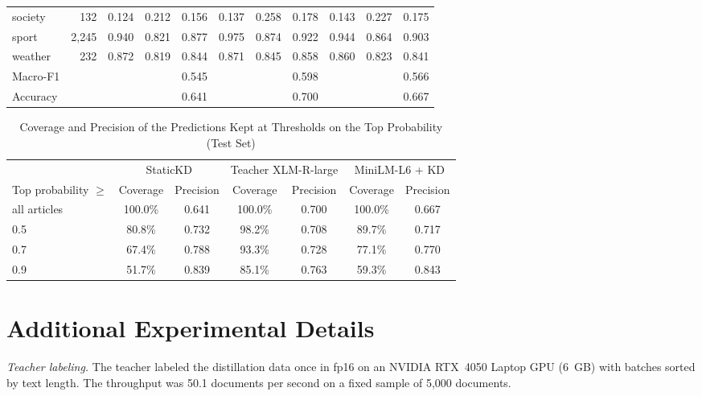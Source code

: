 \documentclass[journal,onecolumn]{IEEEtran}
\begin{document}
\begin{table}[!htbp]
{\begin{tabular}{@{}lrccccccccc@{}}
society & 132 & 0.124 & 0.212 & 0.156 & 0.137 & 0.258 & 0.178 & 0.143 & 0.227 & 0.175 \\
sport & 2,245 & 0.940 & 0.821 & 0.877 & 0.975 & 0.874 & 0.922 & 0.944 & 0.864 & 0.903 \\
weather & 232 & 0.872 & 0.819 & 0.844 & 0.871 & 0.845 & 0.858 & 0.860 & 0.823 & 0.841 \\
\midrule
Macro-F1 &  &  &  & 0.545 &  &  & 0.598 &  &  & 0.566 \\
Accuracy &  &  &  & 0.641 &  &  & 0.700 &  &  & 0.667 \\
\bottomrule
\end{tabular}}
\par\vspace{2pt}{\footnotesize $n$ = number of test articles with the label. Precision is computed over all test articles predicted with the label.\par}
\end{table}

\begin{table}[!htbp]
\caption{Coverage and Precision of the Predictions Kept at Thresholds on the Top Probability (Test Set)}
\label{tab:thresholds}
\centering
\footnotesize
\setlength{\tabcolsep}{4pt}
\begin{tabular}{@{}lcccccc@{}}
\toprule
 & \multicolumn{2}{c}{StaticKD} & \multicolumn{2}{c}{Teacher XLM-R-large} & \multicolumn{2}{c}{MiniLM-L6 + KD} \\
\cmidrule(lr){2-3}\cmidrule(lr){4-5}\cmidrule(lr){6-7}
Top probability $\ge$ & Coverage & Precision & Coverage & Precision & Coverage & Precision \\
\midrule
all articles & 100.0\% & 0.641 & 100.0\% & 0.700 & 100.0\% & 0.667 \\
0.5 & 80.8\% & 0.732 & 98.2\% & 0.708 & 89.7\% & 0.717 \\
0.7 & 67.4\% & 0.788 & 93.3\% & 0.728 & 77.1\% & 0.770 \\
0.9 & 51.7\% & 0.839 & 85.1\% & 0.763 & 59.3\% & 0.843 \\
\bottomrule
\end{tabular}
\par\vspace{2pt}{\footnotesize Coverage = share of the 12,744 test articles whose top probability reaches the threshold. Precision = share of the kept predictions that match the reference label.\par}
\end{table}

\section*{Additional Experimental Details}
\textit{Teacher labeling.} The teacher labeled the distillation data once in fp16 on an NVIDIA RTX~4050 Laptop GPU (6~GB) with batches sorted by text length. The throughput was 50.1 documents per second on a fixed sample of 5,000 documents.
\end{document}
